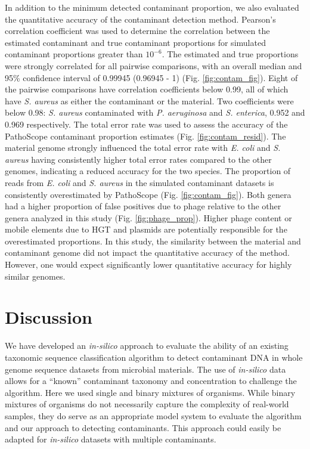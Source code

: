 \documentclass[fleqn,10pt,lineno]{wlpeerj}\usepackage[]{graphicx}\usepackage[]{color}
\begin{document}
In addition to the minimum detected contaminant proportion, we also evaluated the quantitative accuracy of the contaminant detection method.
Pearson's correlation coefficient was used to determine the correlation between the estimated contaminant and true contaminant proportions for simulated contaminant proportions greater than $10^{-6}$.
The estimated and true proportions were strongly correlated for all pairwise comparisons, with an overall median and 95\% confidence interval of 0.99945 (0.96945 - 1) (Fig. \ref{fig:contam_fig}).
Eight of the pairwise comparisons have correlation coefficients below 0.99, all of which have \textit{S. aureus} as either the contaminant or the material.
Two coefficients were below 0.98: \textit{S. aureus} contaminated with \textit{P. aeruginosa} and \textit{S. enterica}, 0.952 and 0.969 respectively.
The total error rate was used to assess the accuracy of the PathoScope contaminant proportion estimates (Fig. \ref{fig:contam_resid}).
The material genome strongly influenced the total error rate with \textit{E. coli} and \textit{S. aureus} having consistently higher total error rates compared to the other genomes, indicating a reduced accuracy for the two species. 
The proportion of reads from \textit{E. coli} and \textit{S. aureus} in the simulated contaminant datasets is consistently overestimated by PathoScope (Fig. \ref{fig:contam_fig}). 
Both genera had a higher proportion of false positives due to phage relative to the other genera analyzed in this study (Fig. \ref{fig:phage_prop}). 
Higher phage content or mobile elements due to HGT and plasmids are potentially responsible for the overestimated proportions.
In this study, the similarity between the material and contaminant genome did not impact the quantitative accuracy of the method. 
However, one would expect significantly lower quantitative accuracy for highly similar genomes. 

\section*{Discussion}

We have developed an \textit{in-silico} approach to evaluate the ability of an existing taxonomic sequence classification algorithm to detect contaminant DNA in whole genome sequence datasets from microbial materials. 
The use of \textit{in-silico} data allows for a “known” contaminant taxonomy and concentration to challenge the algorithm. 
Here we used single and binary mixtures of organisms. 
While binary mixtures of organisms do not necessarily capture the complexity of real-world samples, they do serve as an appropriate model system to evaluate the algorithm and our approach to detecting contaminants. 
This approach could easily be adapted for \textit{in-silico} datasets with multiple contaminants.  
\end{document}
